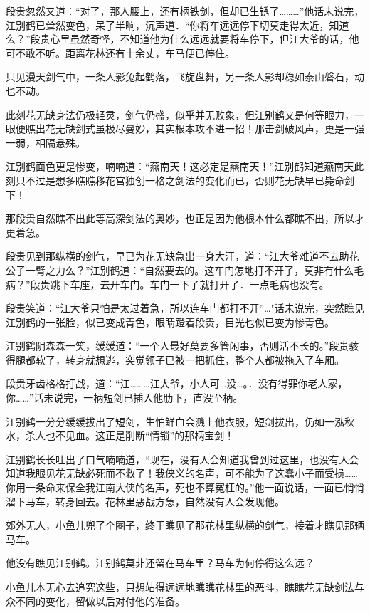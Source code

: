 \documentclass[12pt,oneside]{book}
\begin{document}
段贵忽然又道：``对了，那人腰上，还有柄铁剑，但却已生锈了\ldots\ldots\ldots{}''他话未说完，江别鹤已耸然变色，呆了半晌，沉声道．``你将车远远停下切莫走得太近，知道么？''段贵心里虽然奇怪，不知道他为什么远远就要将车停下，但江大爷的话，他可不敢不听。距离花林还有十余丈，车马便已停住。

只见漫天剑气中，一条人影兔起鹤落，飞旋盘舞，另一条人影却稳如泰山磐石，动也不动。

此刻花无缺身法仍极轻灵，剑气仍盛，似乎并无败象，但江别鹤又是何等眼力，一眼便瞧出花无缺剑式虽极尽曼妙，其实根本攻不进一招！那击剑破风声，更是一强一弱，相隔悬殊。

江别鹤面色更是惨变，喃喃道：``燕南天！这必定是燕南天！''江别鹤知道燕南天此刻只不过是想多瞧瞧移花宫独创一格之剑法的变化而已，否则花无缺早已毙命剑下！

那段贵自然瞧不出此等高深剑法的奥妙，也正是因为他根本什么都瞧不出，所以才更着急。

段贵见到那纵横的剑气，早已为花无缺急出一身大汗，道：``江大爷难道不去助花公子一臂之力么？''江别鹤道：``自然要去的。这车门怎地打不开了，莫非有什么毛病？''段贵跳下车座，去开车门。车门一下子就打开了．一点毛病也没有。

段贵笑道：``江大爷只怕是太过着急，所以连车门都打不开''\ldots"话未说完，突然瞧见江别鹤的一张脸，似已变成青色，眼睛蹬着段贵，目光也似已变为惨青色。

江别鹤阴森森一笑，缓缓道：``一个人最好莫要多管闲事，否则活不长的。''段贵骇得腿都软了，转身就想逃，突觉领子已被一把抓住，整个人都被拖入了车厢。

段贵牙齿格格打战，道：``江\ldots\ldots\ldots 江大爷，小人可\ldots 没\ldots。．没有得罪你老人家，你\ldots\ldots{}''话未说完，一柄短剑已插入他肋下，直没至柄。

江别鹤一分分缓缓拔出了短剑，生怕鲜血会溅上他衣服，短剑拔出，仍如一泓秋水，杀人也不见血。这正是削断``情锁''的那柄宝剑！

江别鹤长长吐出了口气喃喃道，``现在，没有人会知道我曾到过这里，也没有人会知道我眼见花无缺必死而不救了！我侠义的名声，可不能为了这蠢小子而受损\ldots\ldots 你用一条命来保全我江南大侠的名声，死也不算冤枉的。''他一面说话，一面已悄悄溜下马车，转身回去。花林里恶战方急，自然没有人会发现他。

郊外无人，小鱼儿兜了个圈子，终于瞧见了那花林里纵横的剑气，接着才瞧见那辆马车。

他没有瞧见江别鹤。江别鹤莫非还留在马车里？马车为何停得这么远？

小鱼儿本无心去追究这些，只想站得远远地瞧瞧花林里的恶斗，瞧瞧花无缺剑法与众不同的变化，留做以后对付他的准备。
\end{document}

